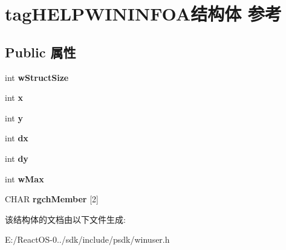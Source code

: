 \hypertarget{structtag_h_e_l_p_w_i_n_i_n_f_o_a}{}\section{tag\+H\+E\+L\+P\+W\+I\+N\+I\+N\+F\+O\+A结构体 参考}
\label{structtag_h_e_l_p_w_i_n_i_n_f_o_a}
\subsection*{Public 属性}
\begin{DoxyCompactItemize}
\item 
\mbox{\label{structtag_h_e_l_p_w_i_n_i_n_f_o_a_ab05ca3d5052c5235c2b8397e631e4df8}} 
int {\bfseries w\+Struct\+Size}
\item 
\mbox{\label{structtag_h_e_l_p_w_i_n_i_n_f_o_a_a38b6fe9c1860dba716cce1f054be6b3a}} 
int {\bfseries x}
\item 
\mbox{\label{structtag_h_e_l_p_w_i_n_i_n_f_o_a_a51e1eb9d8f06a87bdad806f974979921}} 
int {\bfseries y}
\item 
\mbox{\label{structtag_h_e_l_p_w_i_n_i_n_f_o_a_ac6f793c4b18233e07db8bfacca0b40a1}} 
int {\bfseries dx}
\item 
\mbox{\label{structtag_h_e_l_p_w_i_n_i_n_f_o_a_ab5047e2c90d9d4803cb98d67469bb1c4}} 
int {\bfseries dy}
\item 
\mbox{\label{structtag_h_e_l_p_w_i_n_i_n_f_o_a_ac1badc374b220958b2772d9c10e2fffe}} 
int {\bfseries w\+Max}
\item 
\mbox{\label{structtag_h_e_l_p_w_i_n_i_n_f_o_a_a24bbf021288ef1fed6a6d54a783fc88e}} 
C\+H\+AR {\bfseries rgch\+Member} \mbox{[}2\mbox{]}
\end{DoxyCompactItemize}


该结构体的文档由以下文件生成\+:\begin{DoxyCompactItemize}
\item 
E\+:/\+React\+O\+S-\/0../sdk/include/psdk/winuser.\+h\end{DoxyCompactItemize}
